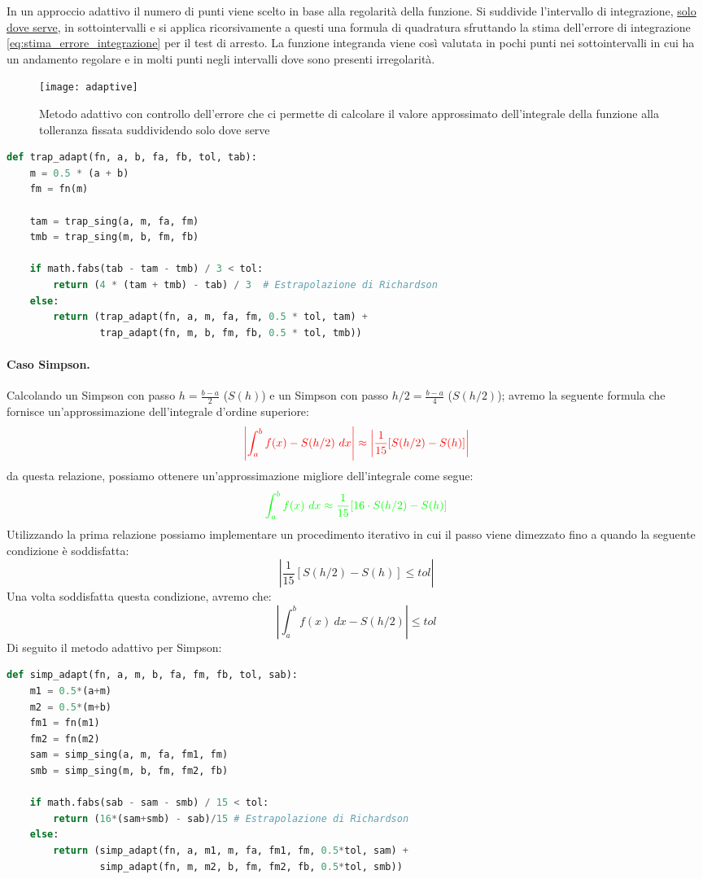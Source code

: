 \documentclass{article}
\begin{document}
In un approccio adattivo il numero di punti viene scelto in base alla
regolarità della funzione. Si suddivide l'intervallo di integrazione,
\underline{solo dove serve}, in sottointervalli e si applica ricorsivamente a
questi una formula di quadratura sfruttando la stima dell'errore di
integrazione \ref{eq:stima_errore_integrazione} per il test di arresto. La
funzione integranda viene così valutata in pochi punti nei sottointervalli in
cui ha un andamento regolare e in molti punti negli intervalli dove sono
presenti irregolarità.
\begin{figure}[ht]
    \centering
    \texttt{[image: adaptive]}
    \caption{Metodo adattivo con controllo dell'errore che ci permette di
    calcolare il valore approssimato dell'integrale della funzione alla
tolleranza fissata suddividendo solo dove serve}
\end{figure}
\begin{lstlisting}[language=Python]
def trap_adapt(fn, a, b, fa, fb, tol, tab):
    m = 0.5 * (a + b)
    fm = fn(m)
    
    tam = trap_sing(a, m, fa, fm)
    tmb = trap_sing(m, b, fm, fb)
    
    if math.fabs(tab - tam - tmb) / 3 < tol:
        return (4 * (tam + tmb) - tab) / 3  # Estrapolazione di Richardson
    else:
        return (trap_adapt(fn, a, m, fa, fm, 0.5 * tol, tam) + 
                trap_adapt(fn, m, b, fm, fb, 0.5 * tol, tmb))
\end{lstlisting}
\paragraph{Caso Simpson.} 
Calcolando un Simpson con passo $h=\frac{b-a}{2}$ ($S(h)$) e
un Simpson con passo $h/2=\frac{b-a}{4}$ ($S(h/2)$); avremo la seguente
formula che fornisce un'approssimazione dell'integrale d'ordine
superiore:
$$ {\color{red}\left\lvert \displaystyle\int_{a}^{b}f(x) - S(h/2)\ dx\right\rvert
\approx \left\lvert \frac{1}{15}[S(h/2)-S(h)]\right\rvert}$$
da questa relazione, possiamo ottenere un'approssimazione migliore
dell'integrale come segue:
$${\color{green}\displaystyle\int_{a}^{b}f(x)\ dx\approx
\frac{1}{15}[16\cdot S(h/2)-S(h)]}$$
Utilizzando la {\color{red} prima relazione} possiamo implementare un
procedimento iterativo in cui il passo viene dimezzato fino a quando
la seguente condizione è soddisfatta: 
$$\left\lvert \frac{1}{15}[S(h/2)-S(h)]\leq tol\right\rvert$$
Una volta soddisfatta questa condizione, avremo che:
$$\left\lvert \displaystyle\int_{a}^{b}f(x)\ dx -
S(h/2)\right\rvert\leq tol$$
Di seguito il metodo adattivo per Simpson:
\begin{lstlisting}[language=Python]
def simp_adapt(fn, a, m, b, fa, fm, fb, tol, sab):
    m1 = 0.5*(a+m)
    m2 = 0.5*(m+b)
    fm1 = fn(m1)
    fm2 = fn(m2)
    sam = simp_sing(a, m, fa, fm1, fm)
    smb = simp_sing(m, b, fm, fm2, fb)
    
    if math.fabs(sab - sam - smb) / 15 < tol:
        return (16*(sam+smb) - sab)/15 # Estrapolazione di Richardson
    else:
        return (simp_adapt(fn, a, m1, m, fa, fm1, fm, 0.5*tol, sam) + 
                simp_adapt(fn, m, m2, b, fm, fm2, fb, 0.5*tol, smb)) 
\end{lstlisting}
\newpage
\end{document}
